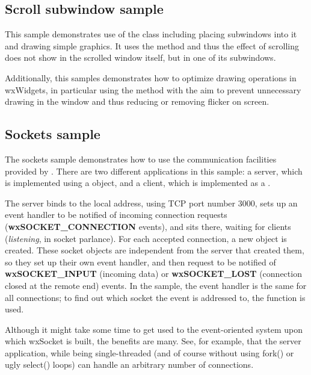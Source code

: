 \subsection{Scroll subwindow sample}\label{samplescrollsub}

This sample demonstrates use of the 
class including placing subwindows into it and drawing simple graphics. It uses the
 method and thus the effect
of scrolling does not show in the scrolled window itself, but in one of its subwindows.

Additionally, this samples demonstrates how to optimize drawing operations in wxWidgets,
in particular using the  method with
the aim to prevent unnecessary drawing in the window and thus reducing or removing
flicker on screen.


\subsection{Sockets sample}\label{samplesockets}

The sockets sample demonstrates how to use the communication facilities
provided by . There are two different
applications in this sample: a server, which is implemented using a
 object, and a client, which
is implemented as a .

The server binds to the local address, using TCP port number 3000,
sets up an event handler to be notified of incoming connection requests
({\bf wxSOCKET\_CONNECTION} events), and sits there, waiting for clients
({\it listening}, in socket parlance). For each accepted connection,
a new  object is created. These
socket objects are independent from the server that created them, so
they set up their own event handler, and then request to be notified
of {\bf wxSOCKET\_INPUT} (incoming data) or {\bf wxSOCKET\_LOST}
(connection closed at the remote end) events. In the sample, the event
handler is the same for all connections; to find out which socket the
event is addressed to, the  function
is used.

Although it might take some time to get used to the event-oriented
system upon which wxSocket is built, the benefits are many. See, for
example, that the server application, while being single-threaded
(and of course without using fork() or ugly select() loops) can handle
an arbitrary number of connections.

